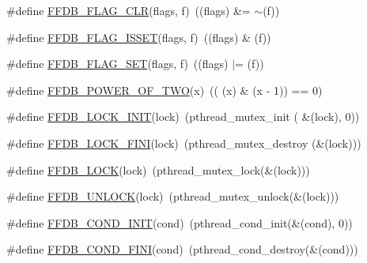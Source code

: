 \begin{DoxyCompactItemize}
\item 
\#define \mbox{\hyperlink{adat-devel_2other__libs_2filedb_2filehash_2ffdb__pagepool_8h_ab474411c6606124ac96464e49450491b}{F\+F\+D\+B\+\_\+\+F\+L\+A\+G\+\_\+\+C\+LR}}(flags,  f)~((flags) \&= $\sim$(f))
\item 
\#define \mbox{\hyperlink{adat-devel_2other__libs_2filedb_2filehash_2ffdb__pagepool_8h_a683f8c92b18290ac9441da989a5545f1}{F\+F\+D\+B\+\_\+\+F\+L\+A\+G\+\_\+\+I\+S\+S\+ET}}(flags,  f)~((flags) \& (f))
\item 
\#define \mbox{\hyperlink{adat-devel_2other__libs_2filedb_2filehash_2ffdb__pagepool_8h_ab71cf0be47170e3d9039fc5b54eb1641}{F\+F\+D\+B\+\_\+\+F\+L\+A\+G\+\_\+\+S\+ET}}(flags,  f)~((flags) $\vert$= (f))
\item 
\#define \mbox{\hyperlink{adat-devel_2other__libs_2filedb_2filehash_2ffdb__pagepool_8h_aad891cad4d93571b9eaaf397018e623f}{F\+F\+D\+B\+\_\+\+P\+O\+W\+E\+R\+\_\+\+O\+F\+\_\+\+T\+WO}}(x)~(( (x) \& (x -\/ 1)) == 0)
\item 
\#define \mbox{\hyperlink{adat-devel_2other__libs_2filedb_2filehash_2ffdb__pagepool_8h_a3d3a05cff58609790fd326517cb637ca}{F\+F\+D\+B\+\_\+\+L\+O\+C\+K\+\_\+\+I\+N\+IT}}(lock)~(pthread\+\_\+mutex\+\_\+init ( \&(lock), 0))
\item 
\#define \mbox{\hyperlink{adat-devel_2other__libs_2filedb_2filehash_2ffdb__pagepool_8h_a105cfacf28ed158c1ee76c1a6dce83dc}{F\+F\+D\+B\+\_\+\+L\+O\+C\+K\+\_\+\+F\+I\+NI}}(lock)~(pthread\+\_\+mutex\+\_\+destroy (\&(lock)))
\item 
\#define \mbox{\hyperlink{adat-devel_2other__libs_2filedb_2filehash_2ffdb__pagepool_8h_a26c5880314b0af06c8f846b79e0e3beb}{F\+F\+D\+B\+\_\+\+L\+O\+CK}}(lock)~(pthread\+\_\+mutex\+\_\+lock(\&(lock)))
\item 
\#define \mbox{\hyperlink{adat-devel_2other__libs_2filedb_2filehash_2ffdb__pagepool_8h_a770bd9e9fabaed425e3d471d346166bc}{F\+F\+D\+B\+\_\+\+U\+N\+L\+O\+CK}}(lock)~(pthread\+\_\+mutex\+\_\+unlock(\&(lock)))
\item 
\#define \mbox{\hyperlink{adat-devel_2other__libs_2filedb_2filehash_2ffdb__pagepool_8h_a031c04f027c2ddd3f608b20c08b4cae8}{F\+F\+D\+B\+\_\+\+C\+O\+N\+D\+\_\+\+I\+N\+IT}}(cond)~(pthread\+\_\+cond\+\_\+init(\&(cond), 0))
\item 
\#define \mbox{\hyperlink{adat-devel_2other__libs_2filedb_2filehash_2ffdb__pagepool_8h_ae2e3fa706d2086441e7d2e7f4d42a9e2}{F\+F\+D\+B\+\_\+\+C\+O\+N\+D\+\_\+\+F\+I\+NI}}(cond)~(pthread\+\_\+cond\+\_\+destroy(\&(cond)))

\end{DoxyCompactItemize}
